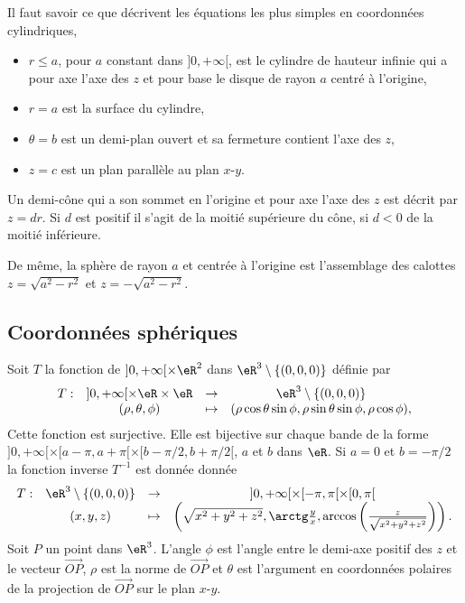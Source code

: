 \begin{example}
Il faut savoir ce que décrivent les équations les plus simples en coordonnées cylindriques, 
\begin{itemize}
\item $r\leq a$, pour $a$ constant dans  $]0, +\infty[$, est le cylindre de hauteur infinie qui a pour axe l'axe des $z$ et pour base le disque de rayon $a$ centré à l'origine, 
\item $r= a$ est  la surface du cylindre,
\item $\theta = b$ est un demi-plan ouvert et sa fermeture contient l'axe des $z$,
\item $z=c$ est un plan parallèle au plan $x$-$y$. 
\end{itemize}
\end{example}

\begin{example}
  Un demi-cône qui a  son sommet en l'origine et  pour axe l'axe des $z$ est décrit par $z=d r$.  Si $d$ est positif  il s'agit  de la moitié supérieure du cône, si $d<0$ de la moitié inférieure.
\end{example}

\begin{example}
 De même,  la sphère de rayon $a$ et centrée à l'origine est l'assemblage des calottes $z=\sqrt{a^2-r^2}$ et $z=-\sqrt{a^2-r^2}$. 
\end{example}
\subsection{Coordonnées sphériques}
Soit $T$ la fonction de $]0, +\infty[\times \eR^2$ dans $\eR^3\setminus\{(0,0,0)\}$ définie par
\begin{equation}
  \begin{array}{lccc}
    T: &]0, +\infty[\times \eR\times \eR & \to & \eR^3\setminus\{(0,0,0)\}\\
 & (\rho, \theta, \phi)&\mapsto& (\rho\cos \theta\sin \phi, \rho \sin \theta\sin \phi, \rho\cos \phi),
  \end{array}
\end{equation}
Cette fonction est surjective. Elle est bijective sur chaque bande de la forme  $]0, +\infty[\times [a-\pi,a+\pi[\times [b-\pi/2, b+\pi/2[$, $a$ et $b$ dans $\eR$.  Si $a =0$ et $b=-\pi/2$ la fonction inverse $T^{-1}$ est donnée donnée
\begin{equation}
  \begin{array}{lccc}
    T: &\eR^3\setminus\{(0,0,0)\} & \to & ]0, +\infty[\times [-\pi,\pi[\times [0, \pi[\\
 & (x,y,z)&\mapsto& \left(\sqrt{x^2+y^2+z^2}, \arctg \frac{y}{x}, \arccos \left(\frac{z}{\sqrt{x^2+y^2+z^2}}\right)\right). 
  \end{array}
\end{equation}
Soit $ P$ un point dans $\eR^3$. L'angle $\phi$ est l'angle entre le demi-axe positif des $z$ et le vecteur $\overrightarrow{OP}$, $\rho$ est la norme de $\overrightarrow{OP}$ et $\theta$ est l'argument en coordonnées polaires de la projection de $\overrightarrow{OP}$ sur le plan $x$-$y$.  

